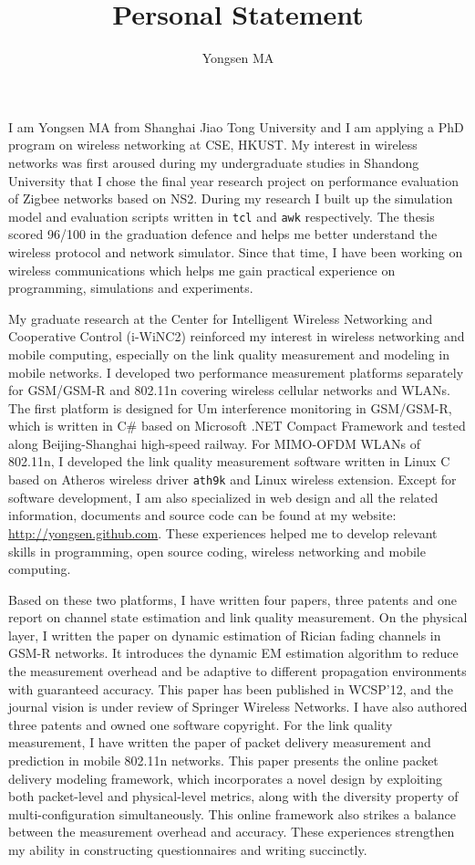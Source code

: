 \documentclass[conference,onecolumn]{IEEEtran}
\title{Personal Statement}
\author{Yongsen MA}
\begin{document}
\maketitle%

I am Yongsen MA from Shanghai Jiao Tong University and I am applying a PhD program on wireless networking at CSE, HKUST. My interest in wireless networks was first aroused during my undergraduate studies in Shandong University that I chose the final year research project on performance evaluation of Zigbee networks based on NS2. During my research I built up the simulation model and evaluation scripts written in \verb"tcl" and \verb"awk" respectively. The thesis scored 96/100 in the graduation defence and helps me better understand the wireless protocol and network simulator. Since that time, I have been working on wireless communications which helps me gain practical experience on programming, simulations and experiments.

My graduate research at the Center for Intelligent Wireless Networking and Cooperative Control (i-WiNC2) reinforced my interest in wireless networking and mobile computing, especially on the link quality measurement and modeling in mobile networks. I developed two performance measurement platforms separately for GSM/GSM-R and 802.11n covering wireless cellular networks and WLANs. The first platform is designed for Um interference monitoring in GSM/GSM-R, which is written in C\# based on Microsoft .NET Compact Framework and tested along Beijing-Shanghai high-speed railway. For MIMO-OFDM WLANs of 802.11n, I developed the link quality measurement software written in Linux C based on Atheros wireless driver \texttt{ath9k} and Linux wireless extension. Except for software development, I am also specialized in web design and all the related information, documents and source code can be found at my website: \url{http://yongsen.github.com}. These experiences helped me to develop relevant skills in programming, open source coding, wireless networking and mobile computing.

Based on these two platforms, I have written four papers, three patents and one report on channel state estimation and link quality measurement. On the physical layer, I written the paper on dynamic estimation of Rician fading channels in GSM-R networks. It introduces the dynamic EM estimation algorithm to reduce the measurement overhead and be adaptive to different propagation environments with guaranteed accuracy. This paper has been published in WCSP'12, and the journal vision is under review of Springer Wireless Networks. I have also authored three patents and owned one software copyright. For the link quality measurement, I have written the paper of packet delivery measurement and prediction in mobile 802.11n networks. This paper presents the online packet delivery modeling framework, which incorporates a novel design by exploiting both packet-level and physical-level metrics, along with the diversity property of multi-configuration simultaneously. This online framework also strikes a balance between the measurement overhead and accuracy. These experiences strengthen my ability in constructing questionnaires and writing succinctly.
\end{document}
